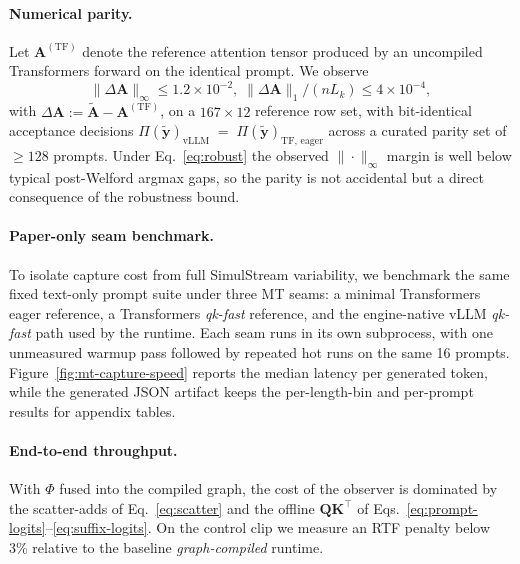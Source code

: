 \documentclass[11pt,twocolumn]{article}
\begin{document}
\paragraph{Numerical parity.}
Let $\mathbf{A}^{(\mathrm{TF})}$ denote the reference attention tensor
produced by an uncompiled Transformers forward on the identical prompt.
We observe
\begin{equation}
  \|\Delta\mathbf{A}\|_\infty \leq 1.2\!\times\!10^{-2},\;
  \|\Delta\mathbf{A}\|_1/(nL_k) \leq 4\!\times\!10^{-4},
  \label{eq:parity}
\end{equation}
with $\Delta\mathbf{A} := \widetilde{\mathbf{A}} - \mathbf{A}^{(\mathrm{TF})}$,
on a $167 \times 12$ reference row set, with bit-identical acceptance
decisions $\Pi\!\left(\widetilde{\mathbf{y}}\right)_{\mathrm{vLLM}}
\;=\; \Pi\!\left(\widetilde{\mathbf{y}}\right)_{\mathrm{TF,\,eager}}$ across
a curated parity set of $\geq 128$ prompts.
Under Eq.~\eqref{eq:robust} the observed
$\|\cdot\|_\infty$ margin is well below typical post-Welford argmax gaps, so
the parity is not accidental but a direct consequence of the robustness
bound.

\paragraph{Paper-only seam benchmark.}
To isolate capture cost from full SimulStream variability, we benchmark the
same fixed text-only prompt suite under three MT seams: a minimal
Transformers eager reference, a Transformers \emph{qk-fast} reference, and the
engine-native vLLM \emph{qk-fast} path used by the runtime. Each seam runs in
its own subprocess, with one unmeasured warmup pass followed by repeated hot
runs on the same 16 prompts. Figure~\ref{fig:mt-capture-speed} reports the
median latency per generated token, while the generated JSON artifact keeps the
per-length-bin and per-prompt results for appendix tables.


\paragraph{End-to-end throughput.}
With $\Phi$ fused into the compiled graph, the cost of the observer is
dominated by the scatter-adds of Eq.~\eqref{eq:scatter} and the offline
$\mathbf{Q}\mathbf{K}^\top$ of
Eqs.~\eqref{eq:prompt-logits}--\eqref{eq:suffix-logits}. On the control
clip we measure an RTF penalty below $3\%$ relative to the baseline
\emph{graph-compiled} runtime.
\end{document}
